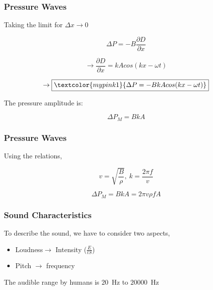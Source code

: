 \documentclass[]{beamer}
\begin{document}
\begin{frame}
\frametitle{Pressure Waves}
Taking the limit for $\Delta x\rightarrow 0$

\begin{equation*}
\Delta P=-B\frac{\partial  D}{\partial x}
\end{equation*}



\begin{equation*}
  \rightarrow \frac{\partial  D}{\partial x}=kA cos(kx-\omega t)
\end{equation*}



\begin{equation}
  \rightarrow \boxed{\textcolor{mypink1}{\Delta P=-BkA cos(kx-\omega t)}}
\end{equation}

The pressure amplitude is:


\begin{equation}
\Delta P_M=BkA 
\end{equation}

  \end{frame}




\begin{frame}
\frametitle{Pressure Waves}
Using the relations,


\begin{equation*}
v=\sqrt{\frac{B}{\rho}}, \ k=\frac{2\pi f}{v}
\end{equation*}

\begin{equation}
\Delta P_M=BkA =\boxed{2\pi v \rho f A}
\end{equation}

  \end{frame}


\begin{frame}
  \frametitle{Sound Characteristics}
  
  To describe the sound, we have to consider two aspects,
  \vspace{5mm}
  
  \pause
  
  \begin{itemize}
  \item Loudness$\rightarrow$ Intensity ($\frac{E}{tS}$)
  \pause
  
  \item Pitch $\rightarrow$   frequency
  \end{itemize}
  
  \pause
  
  \vspace{3mm}
  
  The audible range by humans  is $20$~Hz to $20000$~Hz
  
    \end{frame}
\end{document}
